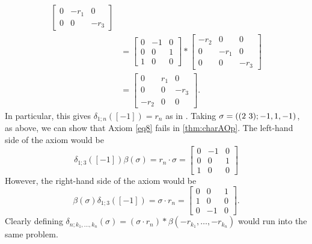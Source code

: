 \begin{example}
\begin{align*}
\begin{bmatrix}
      0 & -r_1 & 0 \\
      0 & 0 & -r_3
      \end{bmatrix}\\
&=
    \begin{bmatrix}
      0 & -1 & 0 \\
      0 & 0 & 1 \\
      1 & 0 & 0
      \end{bmatrix}
      \ast
      \begin{bmatrix}
      -r_2 & 0 & 0 \\
      0 & -r_1 & 0 \\
      0 & 0 & -r_3
      \end{bmatrix}\\
      &= \begin{bmatrix}
      0 & r_1 & 0\\
      0 & 0 & -r_3 \\
      -r_2 & 0 & 0
      \end{bmatrix}.
    \end{align*}
In particular, this gives $\delta_{1;n}([-1]) = r_n$ as in \cite{zhang-grp}. Taking $\sigma = (( 2 \, \, 3 );-1,1,-1)$, as above, we can show that Axiom \ref{eq8} fails in \cref{thm:charAOp}. The left-hand side of the axiom would be
        \[
          \delta_{1;3}([-1])\beta(\sigma) = r_n \cdot \sigma =
          \begin{bmatrix}
          0 & -1 & 0 \\
          0 & 0 & 1 \\
          1 & 0 & 0
          \end{bmatrix}
        \]
However, the right-hand side of the axiom would be
  \[
    \beta(\sigma)\delta_{1;3}([-1]) = \sigma \cdot r_n =
    \begin{bmatrix}
    0 & 0 & 1 \\
    1 & 0 & 0 \\
    0 & -1 & 0
    \end{bmatrix}.
  \]
Clearly defining $\delta_{n;k_1,\ldots,k_n}(\sigma) = (\sigma \cdot r_n) \ast \beta(-r_{k_1},\ldots,-r_{k_n})$ would run into the same problem.


\end{example}
